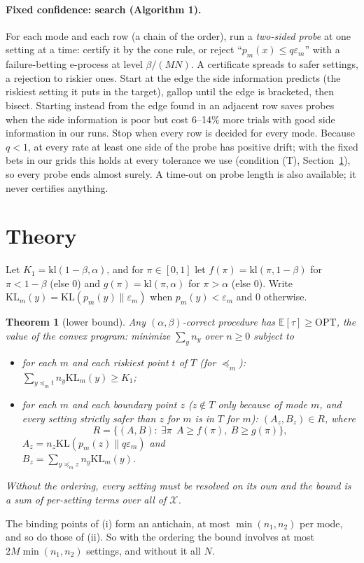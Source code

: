\documentclass{article}
\newtheorem{theorem}{Theorem}
\newcommand{\eps}{\varepsilon}
\newcommand{\KL}{\mathrm{KL}}
\newcommand{\kl}{\mathrm{kl}}
\newcommand{\cX}{\mathcal{X}}
\newcommand{\preceqm}{\preceq_m}
\newcommand{\E}{\mathbb{E}}
\begin{document}
\paragraph{Fixed confidence: search (Algorithm 1).} For each mode and each row (a chain
of the order), run a \emph{two-sided probe} at one setting at a time:
certify it by the cone rule, or reject ``$p_m(x)\le q\eps_m$'' with a
failure-betting e-process at level $\beta/(MN)$. A certificate spreads to
safer settings, a rejection to riskier ones. Start at the edge the side
information predicts (the riskiest setting it puts in the target), gallop
until the edge is bracketed, then bisect. Starting instead from the edge
found in an adjacent row saves probes when the side information is poor
but cost 6--14\% more trials with good side information in our runs. Stop when every row is decided for every
mode. Because $q<1$, at every rate at least one side of the probe has
positive drift; with the fixed bets in our grids this holds at every
tolerance we use (condition (T), Section~\ref{sec:theory}), so every probe
ends almost surely. A time-out on probe length is also available; it
never certifies anything.

\section{Theory}\label{sec:theory}

Let $K_1=\kl(1-\beta,\alpha)$, and for $\pi\in[0,1]$ let
$f(\pi)=\kl(\pi,1-\beta)$ for $\pi<1-\beta$ (else 0) and
$g(\pi)=\kl(\pi,\alpha)$ for $\pi>\alpha$ (else 0). Write
$\KL_m(y)=\KL(p_m(y)\|\eps_m)$ when $p_m(y)<\eps_m$ and 0 otherwise.

\begin{theorem}[lower bound]\label{thm:lb}
Any $(\alpha,\beta)$-correct procedure has $\E[\tau]\ge\mathrm{OPT}$, the
value of the convex program: minimize $\sum_y n_y$ over $n\ge0$ subject to
\begin{itemize}
\item[(i)] for each $m$ and each riskiest point $t$ of $T$ (for $\preceqm$):
$\sum_{y\preceqm t} n_y\KL_m(y)\ge K_1$;
\item[(ii)] for each $m$ and each \emph{boundary point} $z$ ($z\notin T$
only because of mode $m$, and every setting strictly safer than $z$ for $m$
is in $T$ for $m$): $(A_z,B_z)\in R$, where
\[
R=\{(A,B):\ \exists\pi\ \ A\ge f(\pi),\ B\ge g(\pi)\},
\]
$A_z=n_z\KL(p_m(z)\|q\eps_m)$ and\\
$B_z=\sum_{y\preceqm z}n_y\KL_m(y)$.
\end{itemize}
Without the ordering, every setting must be resolved on its own and the
bound is a sum of per-setting terms over all of $\cX$.
\end{theorem}
The binding points of (i) form an antichain, at most $\min(n_1,n_2)$ per
mode, and so do those of (ii). So with the ordering the bound involves at
most $2M\min(n_1,n_2)$ settings, and without it all $N$.
\end{document}
